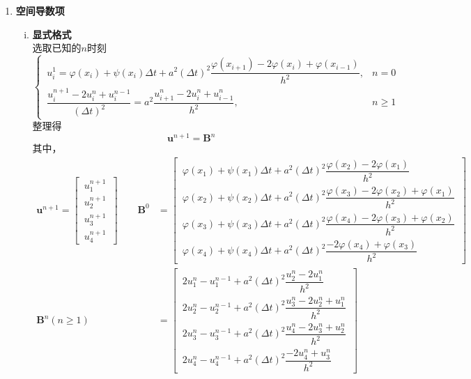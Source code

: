 \begin{enumerate}[\textbf{步骤} 1 ]
\begin{enumerate}[(1) ]
		\item \textbf{空间导数项}
		\begin{enumerate}[i. ]
			\item \textbf{显式格式}\\
			选取已知的$n$时刻
			\begin{equation}
				\begin{cases}
					\, u_i^1=\varphi(x_i)+\psi(x_i)\Delta t + a^2 (\Delta t)^2\dfrac{\varphi(x_{i+1})-2\varphi(x_i)+\varphi(x_{i-1})}{h^2}, & n = 0\\[1em]
					\,
					\dfrac{u_i^{n+1}-2u_i^n+u_i^{n-1}}{(\Delta t)^2} = a^2 \dfrac{u_{i+1}^n - 2u_i^n + u_{i-1}^n}{h^2}, & n \ge 1
				\end{cases}
			\end{equation}
			整理得
			\begin{equation}
				\bm{u}^{n+1} = \bm{B}^n
			\end{equation}
			其中，
			\begin{align}
				\bm{u}^{n+1} = 
			\begin{bmatrix}
				\, u_1^{n+1}\, \\
				\, u_2^{n+1}\, \\
				\, u_3^{n+1}\, \\
				\, u_4^{n+1}\,
			\end{bmatrix}
			\quad \quad
			\bm{B}^0 &= 
			\begin{bmatrix}
				\, \varphi(x_1)+\psi(x_1)\Delta t + a^2 (\Delta t)^2\dfrac{\varphi(x_2)-2\varphi(x_1)}{h^2} \,\\[1em]
				\, \varphi(x_2)+\psi(x_2)\Delta t + a^2 (\Delta t)^2\dfrac{\varphi(x_3)-2\varphi(x_2) + \varphi(x_1)}{h^2} \, \\[1em]
				\,  \varphi(x_3)+\psi(x_3)\Delta t + a^2 (\Delta t)^2\dfrac{\varphi(x_4)-2\varphi(x_3) + \varphi(x_2)}{h^2}  \, \\[1em]
				\, \varphi(x_4)+\psi(x_4)\Delta t + a^2 (\Delta t)^2\dfrac{-2\varphi(x_4) + \varphi(x_3)}{h^2} \, 
			\end{bmatrix}
			\\[1em]
			\bm{B}^{n}(n\ge 1)& =
			\begin{bmatrix}
				\, 2u_1^n - u_1^{n-1} + a^2(\Delta t)^2\dfrac{u_2^n-2u_1^n}{h^2}\,\\[1em]
				\,2u_2^n - u_2^{n-1} + a^2(\Delta t)^2\dfrac{u_3^n-2u_2^n+u_1^n}{h^2} \, \\[1em]
				\,  2u_3^n - u_3^{n-1} + a^2(\Delta t)^2\dfrac{u_4^n-2u_3^n + u_2^n}{h^2}  \, \\[1em]
				\, 2u_4^n - u_4^{n-1} + a^2(\Delta t)^2\dfrac{-2u_4^n+u_3^n}{h^2} \, 
			\end{bmatrix}
			\end{align}
			

\end{enumerate}
\end{enumerate}
\end{enumerate}

